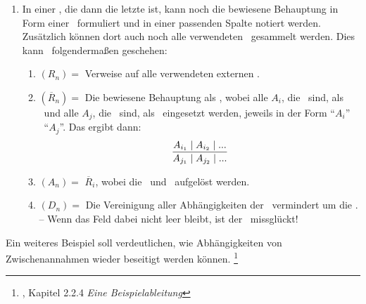 {\begin{enumerate}
	Nun kann die Zeile beendet werden, oder es geht weiter mit:
	\begin{enumerate}
		\setcounter{enumii}{\value{Enumii}}%
		\item \label{item-Anwendung} $Z_n =$ Die Indizes aller $A_j$ (mit $j < i$), die eine \Voraussetzung\ der \Schlussregel\ $\overline{R}_i$ sind, möglichst in der verwendeten Reihenfolge.
		-- Für jedes angegebene $j$ werden noch die Abhängigkeiten $D_j$ den Abhängigkeiten $D_i$ hinzugefügt.
		\item $A_i =$ \Folgerung(en) der \Schlussregel\ $\overline{R}_i$.
		-- Wenn diese \Folgerungen\ schon als \Aussagen\ $A_j$ (mit $j < i$) vorhanden sind, können auch einfach deren Indizes eingetragen werden.
		Damit werden die Zusammenhänge und der Abschluss des \Beweises\ besser ersichtlich.
		\item $D_i =$ Die Verweise wurden schon in (\ref{item-Anwendung}) eingetragen.%
		\footnote{Wenn $D_n$ leer ist, dann ist $A_n$ allgemeingültig.}
	\end{enumerate}
	Der \Beweis\ muss so lange fortgeführt werden, bis alle \Folgerungen\ als \Aussagen\ in der Spalte $(A_n)$ erschienen und dort jeweils nur von den gegebenen \Voraussetzungen\ abhängig sind.
	\item \label{item-Ergebniszeile} In einer , die dann die letzte ist, kann noch die bewiesene Behauptung in Form einer \Schlussregel\ formuliert und in einer passenden Spalte notiert werden.
	Zusätzlich können dort auch noch alle verwendeten \Schlussregeln\ gesammelt werden.
	Dies kann \textzB\ folgendermaßen geschehen:
	\begin{enumerate}
		\item $(R_n) =$ Verweise auf alle verwendeten externen \Schlussregeln.
		\item $(\overline{R}_n) =$ Die bewiesene Behauptung als \Schlussregeln, wobei alle $A_i$, die \Voraussetzungen\ sind, als \Voraussetzung\ und alle $A_j$, die \Folgerungen\ sind, als \Folgerung\ eingesetzt werden, jeweils in der Form \enquote{$A_i$} \textbzgl\ \enquote{$A_j$}.
		Das ergibt dann:
		\[ \frac{A_{i_1} \mathrel{\mid} A_{i_2} \mathrel{\mid} ...}{A_{j_1} \mathrel{\mid} A_{j_2} \mathrel{\mid} ...} \]
		\item $(A_n) =$ $\overline{R}_i$, wobei die \Voraussetzungen\ und \Folgerungen\ aufgelöst werden.
		\item $(D_n) =$ Die Vereinigung aller Abhängigkeiten der \Folgerungen\, vermindert um die \Voraussetzungen.
		-- Wenn das Feld dabei nicht leer bleibt, ist der \Beweis\ missglückt!
	\end{enumerate}
\end{enumerate}
%
Ein weiteres Beispiel  soll verdeutlichen, wie Abhängigkeiten von Zwischenannahmen wieder beseitigt werden können.%
\footnote{, Kapitel 2.2.4 \emph{Eine Beispielableitung}}

}
